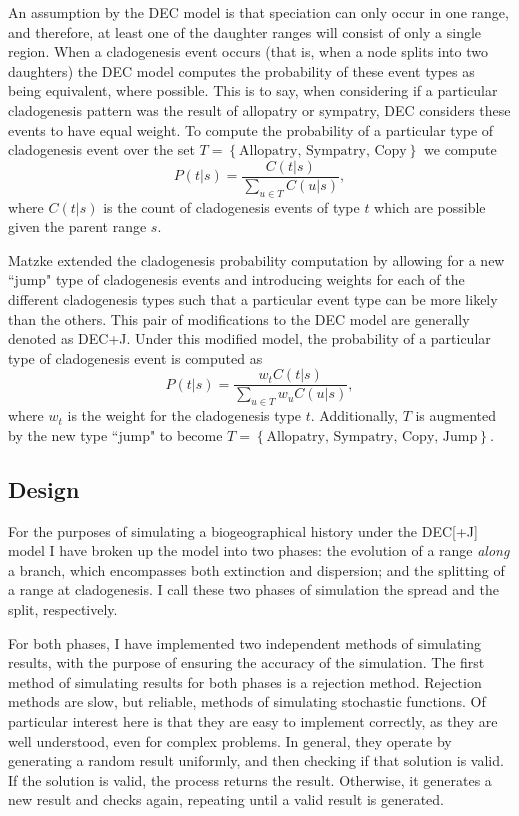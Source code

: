 \documentclass{article}
\begin{document}
An assumption by the DEC model is that speciation can only occur in one range,
and therefore, at least one of the daughter ranges will consist of only a
single region.
When a cladogenesis event occurs (that is, when a node splits into two
daughters) the DEC model computes the probability of these event types as being
equivalent, where possible.
This is to say, when considering if a particular cladogenesis pattern was the
result of allopatry or sympatry, DEC considers these events to have equal
weight.
To compute the probability of a particular type of cladogenesis event over the
set \(T = \left\{\text{Allopatry, Sympatry, Copy}\right\}\) we compute
\[
	P(t |
	s) = \frac{C(t | s)}{\sum_{u \in T} C(u | s)},
\]
where \( C(t|s) \) is the
count of cladogenesis events of type $ t $ which are possible given the parent
range \( s \).

Matzke\cite{ModelSelectionMatzke2014} extended the cladogenesis probability
computation by allowing for a new ``jump" type of cladogenesis events and
introducing weights for each of the different cladogenesis types such that a
particular event type can be more likely than the others.
This pair of modifications to the DEC model are generally denoted as DEC+J.
Under this modified model, the probability of a particular type of cladogenesis
event is computed as
\[
	P(t | s) = \frac{w_t C(t | s)}{\sum_{u \in T} w_u C(u |
		s)},
\]
where $w_t$ is the weight for the cladogenesis type $t$.
Additionally, $T$ is augmented by the new type ``jump" to become \(T =
\left\{\text{Allopatry, Sympatry, Copy, Jump}\right\} \).

\subsection{Design}

For the purposes of simulating a biogeographical history under the DEC[+J]
model I have broken up the model into two phases: the evolution of a range
\textit{along} a branch, which encompasses both extinction and dispersion; and
the splitting of a range at cladogenesis.
I call these two phases of simulation the spread and the split, respectively.

For both phases, I have implemented two independent methods of simulating
results, with the purpose of ensuring the accuracy of the simulation.
The first method of simulating results for both phases is a rejection method.
Rejection methods are slow, but reliable, methods of simulating stochastic
functions.
Of particular interest here is that they are easy to implement correctly, as
they are well understood, even for complex problems.
In general, they operate by generating a random result uniformly, and then
checking if that solution is valid.
If the solution is valid, the process returns the result.
Otherwise, it generates a new result and checks again, repeating until a valid
result is generated.
\end{document}
